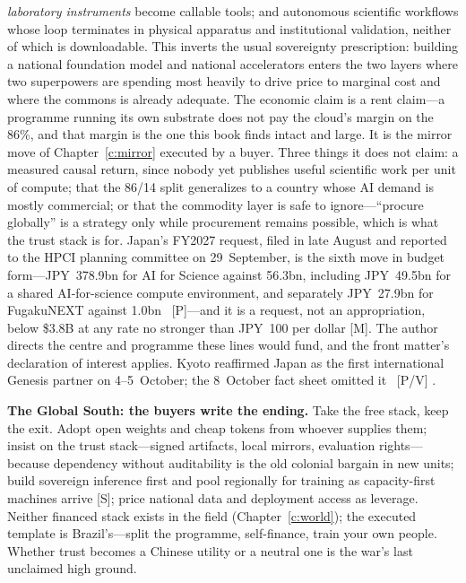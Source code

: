\emph{laboratory instruments} become callable tools; and autonomous scientific workflows whose loop terminates in physical apparatus and institutional validation, neither of which is downloadable. This inverts the usual sovereignty prescription: building a national foundation model and national accelerators enters the two layers where two superpowers are spending most heavily to drive price to marginal cost and where the commons is already adequate. The economic claim is a rent claim---a programme running its own substrate does not pay the cloud's margin on the 86\%, and that margin is the one this book finds intact and large. It is the mirror move of Chapter~\ref{c:mirror} executed by a buyer. Three things it does not claim: a measured causal return, since nobody yet publishes useful scientific work per unit of compute; that the 86/14 split generalizes to a country whose AI demand is mostly commercial; or that the commodity layer is safe to ignore---``procure globally'' is a strategy only while procurement remains possible, which is what the trust stack is for. Japan's FY2027 request, filed in late August and reported to the HPCI planning committee on 29~September, is the sixth move in budget form---JPY~378.9bn for AI for Science against 56.3bn, including JPY~49.5bn for a shared AI-for-science compute environment, and separately JPY~27.9bn for FugakuNEXT against 1.0bn~\cite{gov-mext-fy2027} [P]---and it is a request, not an appropriation, below \$3.8B at any rate no stronger than JPY~100 per dollar [M]. The author directs the centre and programme these lines would fund, and the front matter's declaration of interest applies. Kyoto reaffirmed Japan as the first international Genesis partner on 4--5~October; the 8~October fact sheet omitted it~\cite{gov-japan-us-kyoto,sci-wh-summit} [P/V] .

\textbf{The Global South: the buyers write the ending.} Take the free stack, keep the exit. Adopt open weights and cheap tokens from whoever supplies them; insist on the trust stack---signed artifacts, local mirrors, evaluation rights---because dependency without auditability is the old colonial bargain in new units; build sovereign inference first and pool regionally for training as capacity-first machines arrive [S]; price national data and deployment access as leverage. Neither financed stack exists in the field (Chapter~\ref{c:world}); the executed template is Brazil's---split the programme, self-finance, train your own people. Whether trust becomes a Chinese utility or a neutral one is the war's last unclaimed high ground.

